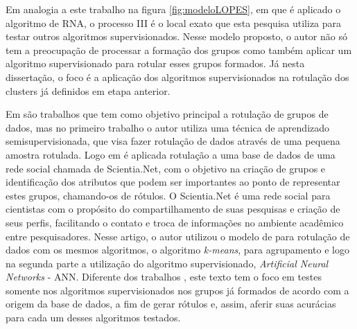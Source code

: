 Em analogia a este trabalho na figura \ref{fig:modeloLOPES}, em que é aplicado o algoritmo de RNA, o processo III é o local exato que esta pesquisa utiliza para testar outros algoritmos supervisionados. Nesse modelo proposto, o autor não só tem a preocupação de processar a formação dos grupos como também aplicar um algoritmo supervisionado para rotular esses grupos formados. Já nesta dissertação, o foco é a aplicação dos algoritmos supervisionados na rotulação dos clusters já definidos em etapa anterior. 



Em \cite{Metodo2015,DeLima2015} são trabalhos que tem como objetivo principal a rotulação de grupos de dados, mas no primeiro trabalho o autor utiliza uma técnica de aprendizado semisupervisionada, que visa fazer rotulação de dados através de uma pequena amostra rotulada. Logo em \cite{DeLima2015} é aplicada rotulação a uma base de dados de uma rede social chamada de Scientia.Net, com o objetivo na criação de grupos e identificação dos atributos que podem ser importantes ao ponto de representar estes grupos, chamando-os de rótulos. O Scientia.Net é uma rede social para cientistas com o propósito do compartilhamento de suas pesquisas e criação de seus perfis, facilitando o contato e troca de informações no ambiente acadêmico entre pesquisadores. Nesse artigo, o autor utilizou o modelo de \cite{Lopes2016} para rotulação de dados com os mesmos algoritmos, o algoritmo \textit{k-means}, para agrupamento e logo na segunda parte a utilização do algoritmo supervisionado, \textit{Artificial Neural Networks} - ANN. Diferente dos trabalhos \cite{Metodo2015,DeLima2015}, este texto tem o foco em testes somente nos algoritmos supervisionados nos grupos já formados de acordo com a origem da base de dados, a fim de gerar rótulos e, assim, aferir suas acurácias para cada um desses algoritmos testados. 
% 
% 
% 
